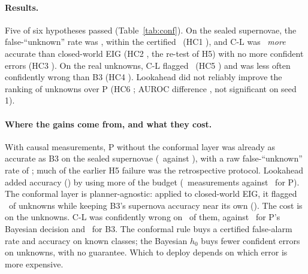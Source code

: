 \paragraph{Results.} Five of six hypotheses passed (Table~\ref{tab:conf}). On the sealed supernovae, the false-``unknown'' rate was \ConfFa, within the certified \ConfAlphaPct\ (HC1 \ConfHCOneVerdict), and C-L was \ConfAccGain\ \emph{more} accurate than closed-world EIG (HC2 \ConfHCTwoVerdict, the re-test of H5) with no more confident errors (HC3 \ConfHCThreeVerdict). On the real unknowns, C-L flagged \ConfFlag\ (HC5 \ConfHCFiveVerdict) and was less often confidently wrong than B3 (HC4 \ConfHCFourVerdict). Lookahead did not reliably improve the ranking of unknowns over P (HC6 \ConfHCSixVerdict; AUROC difference \ConfAucGain, not significant on seed 1).

\paragraph{Where the gains come from, and what they cost.} With causal measurements, P without the conformal layer was already as accurate as B3 on the sealed supernovae (\ConfAccFreshP\ against \ConfAccFreshBthree), with a raw false-``unknown'' rate of \ConfRawFaFreshP; much of the earlier H5 failure was the retrospective protocol. Lookahead added accuracy (\ConfAccFreshCL) by using more of the budget (\ConfObsL\ measurements against \ConfObsP\ for P). The conformal layer is planner-agnostic: applied to closed-world EIG, it flagged \ConfFlagBthreeConf\ of unknowns while keeping B3's supernova accuracy near its own (\ConfAccFreshBthreeConf). The cost is on the unknowns. C-L was confidently wrong on \ConfCwUnkCL\ of them, against \ConfCwUnkP\ for P's Bayesian decision and \ConfCwUnkBthree\ for B3. The conformal rule buys a certified false-alarm rate and accuracy on known classes; the Bayesian $h_0$ buys fewer confident errors on unknowns, with no guarantee. Which to deploy depends on which error is more expensive.
